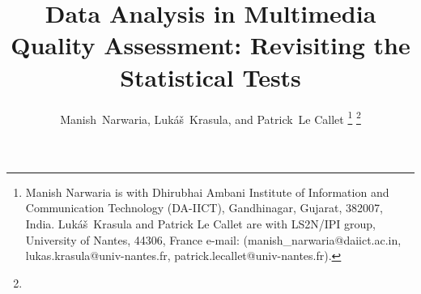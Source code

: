 \documentclass[10pt,final,Twcolumn]{IEEEtran}
\begin{document}
%

%
\title{Data Analysis in Multimedia Quality Assessment: Revisiting the Statistical Tests}





\author{Manish~Narwaria,
 Luk\'{a}\v{s}~Krasula, and
      Patrick~Le Callet
\thanks{Manish Narwaria is with Dhirubhai Ambani Institute of Information and Communication Technology (DA-IICT), Gandhinagar, Gujarat, 382007, India. Luk\'{a}\v{s}~Krasula and Patrick Le Callet are with LS2N/IPI group, University of Nantes, 44306, France
e-mail: (manish\_narwaria@daiict.ac.in, lukas.krasula@univ-nantes.fr, patrick.lecallet@univ-nantes.fr).}%
\thanks{}}









\maketitle




 

\end{document}
